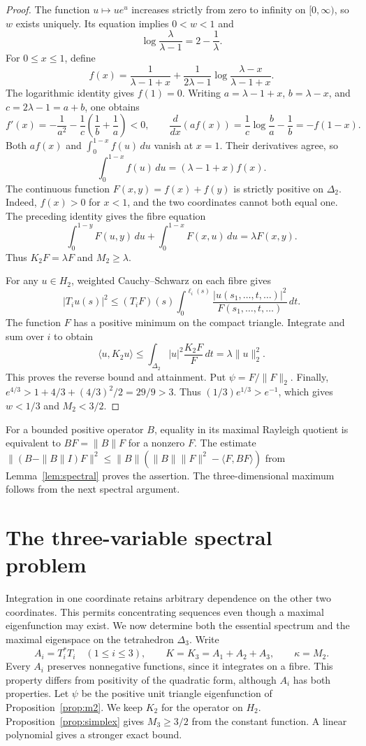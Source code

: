 \documentclass[11pt]{article}
\begin{document}
\begin{proof}
The function $u\mapsto ue^u$ increases strictly from zero to infinity
on $[0,\infty)$, so $w$ exists uniquely.
Its equation implies $0<w<1$ and
\[
 \log\frac{\lambda}{\lambda-1}=2-\frac1\lambda.
\]
For $0\leq x\leq1$, define
\[
 f(x)=\frac1{\lambda-1+x}
     +\frac1{2\lambda-1}\log\frac{\lambda-x}{\lambda-1+x}.
\]
The logarithmic identity gives $f(1)=0$.
Writing $a=\lambda-1+x$, $b=\lambda-x$, and $c=2\lambda-1=a+b$,
one obtains
\[
 f'(x)=-\frac1{a^2}-\frac1c\left(\frac1b+\frac1a\right)<0,
 \qquad
 \frac{d}{dx}(af(x))=\frac1c\log\frac ba-\frac1b=-f(1-x).
\]
Both $af(x)$ and $\int_0^{1-x}f(u)\,du$ vanish at $x=1$.
Their derivatives agree, so
\[
                 \int_0^{1-x}f(u)\,du=(\lambda-1+x)f(x).
\]
The continuous function $F(x,y)=f(x)+f(y)$ is strictly positive on
$\Delta_2$.  Indeed, $f(x)>0$ for $x<1$, and the two coordinates cannot
both equal one.  The preceding identity gives the
fibre equation
\[
 \int_0^{1-y}F(u,y)\,du+\int_0^{1-x}F(x,u)\,du
                       =\lambda F(x,y).
\]
Thus $K_2F=\lambda F$ and $M_2\geq\lambda$.

For any $u\in H_2$, weighted Cauchy--Schwarz on each fibre gives
\[
 |T_i u(s)|^2\leq (T_iF)(s)
                 \int_0^{\ell_i(s)}\frac{|u(s_1,\ldots,t,\ldots)|^2}
                                              {F(s_1,\ldots,t,\ldots)}\,dt.
\]
The function $F$ has a positive minimum on the compact triangle.
Integrate and sum over $i$ to obtain
\[
 \langle u,K_2u\rangle
 \leq\int_{\Delta_2}|u|^2\frac{K_2F}{F}\,dt
 =\lambda\|u\|_2^2.
\]
This proves the reverse bound and attainment.  Put $\psi=F/\|F\|_2$.
Finally, $e^{4/3}>1+4/3+(4/3)^2/2=29/9>3$.
Thus $(1/3)e^{1/3}>e^{-1}$, which gives $w<1/3$ and $M_2<3/2$.
\end{proof}

For a bounded positive operator $B$, equality in its maximal Rayleigh
quotient is equivalent to $BF=\|B\|F$ for a nonzero $F$.
The estimate
$\|(B-\|B\|I)F\|^2\leq\|B\|(\|B\|\|F\|^2-\langle F,BF\rangle)$
from Lemma~\ref{lem:spectral} proves the assertion.
The three-dimensional maximum follows from the next spectral argument.

\section{The three-variable spectral problem}\label{sec:three-variable}

Integration in one coordinate retains arbitrary dependence on the other
two coordinates.  This permits concentrating sequences even though a
maximal eigenfunction may exist.
We now determine both the essential spectrum and the maximal eigenspace
on the tetrahedron $\Delta_3$.
Write
\[
 A_i=T_i^*T_i\quad(1\leq i\leq3),\qquad K=K_3=A_1+A_2+A_3,
 \qquad \kappa=M_2.
\]
Every $A_i$ preserves nonnegative functions, since it integrates on a fibre.
This property differs from positivity of the quadratic form,
although $A_i$ has both properties.
Let $\psi$ be the positive unit triangle eigenfunction of
Proposition~\ref{prop:m2}.  We keep $K_2$ for the operator on $H_2$.
Proposition~\ref{prop:simplex} gives $M_3\geq3/2$ from the constant
function.  A linear polynomial gives a stronger exact bound.
\end{document}
